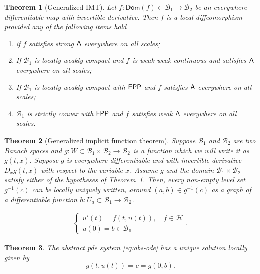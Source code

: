 \documentclass[10pt,a4paper]{amsart}
\newtheorem{theorem}{Theorem}
\newcommand{\B}{\mathcal{B}}
\begin{document}
\begin{theorem}[Generalized IMT]\label{thrm:main-1}
Let $f: \mathsf{Dom}(f) \subset \B_1 \to \B_2$ be an everywhere differentiable map with invertible derivative. Then $f$ is a local diffeomorphism provided any of the following items hold
	\begin{enumerate}
		\item if $f$ satisfies strong ${\sf A}$ everywhere on all scales;
		\item If $\B_1$ is locally weakly compact and $f$ is weak-weak continuous and satisfies ${\sf A}$ everywhere on all scales;
		\item If $\B_1$ is locally weakly compact with ${\sf FPP}$ and $f$ satisfies ${\sf A}$ everywhere on all scales; 
		\item $\B_1$ is strictly convex with ${\sf FPP}$ and $f$ satisfies weak ${\sf A}$ everywhere on all scales. 
	\end{enumerate} 
\end{theorem}

\begin{theorem}[Generalized implicit function theorem]\label{thrm:main-2}
	Suppose $\B_1$ and $\B_2$ are two Banach spaces and $g:W \subset \B_1 \times \B_2 \to \B_2$ is a function which we will write it as $g(t,x)$. Suppose $g$ is everywhere differentiable and with invertible derivative $D_x g(t,x)$ with respect to the variable $x$. Assume $g$ and the domain $\B_1\times \B_2$ satisfy either of the hypotheses of Theorem~\ref{thrm:main-1}. Then, every non-empty level set $g^{-1}(c)$ can be locally uniquely written, around $(a,b) \in g^{-1}(c)$ as a graph of a differentiable function $h: U_a \subset \B_1 \to \B_2$. 
\end{theorem}

\begin{align}\label{eq:abs-ode}
\begin{cases} u'(t) = f(t,u(t)), \quad f \in \mathcal{H}\\
	u(0) = b\in \B_1
\end{cases}.
\end{align}

\begin{theorem}
	The abstract pde system \eqref{eq:abs-ode} has a unique solution locally given by
	\[
	g(t,u(t)) = c = g(0,b).
	\]
\end{theorem}
\end{document}
